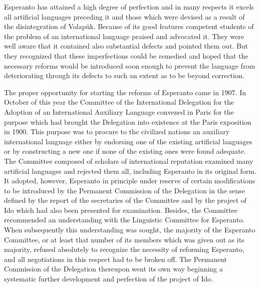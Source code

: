 Esperanto has attained a high degree of perfection and in many respects it excels all artificial languages preceding it and those which were devised as a result of the disintegration of Volapük. Because of its good features competent students of the problem of an international language praised and advocated it. They were well aware that it contained also substantial defects and pointed them out. But they recognized that these imperfections could be remedied and hoped that the necessary reforms would be introduced soon enough to prevent the language from deteriorating through its defects to such an extent as to be beyond correction. 

The proper opportunity for starting the reforms of Esperanto came in 1907. In October of this year the Committee of the International Delegation for the Adoption of an International Auxiliary Language convened in Paris for the purpose which had brought the Delegation into existence at the Paris exposition in 1900. This purpose was to procure to the civilized nations an auxiliary international language either by endorsing one of the existing artificial languages or by constructing a new one if none of the existing ones were found adequate. The Committee composed of scholars of international reputation examined many artificial languages and rejected them all, including Esperanto in its original form. It adopted, however, Esperanto in principle under reserve of certain modifications to be introduced by the Permanent Commission of the Delegation in the sense defined by the report of the secretaries of the Committee and by the project of Ido which had also been presented for examination. Besides, the Committee recommended an understanding with the Linguistic Committee for Esperanto. When subsequently this understanding was sought, the majority of the Esperanto Committee, or at least that number of its members which was given out as its majority, refused absolutely to recognize the necessity of reforming Esperanto, and all negotiations in this respect had to be broken off. The Permanent Commission of the Delegation thereupon went its own way beginning a systematic further development and perfection of the project of Ido. 

